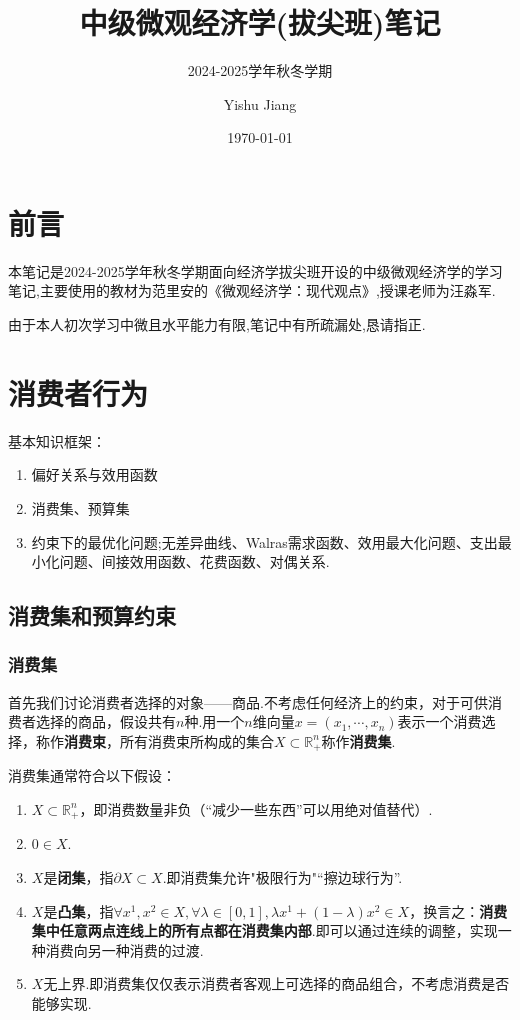 \documentclass[lang=cn,10pt]{elegantbook}
\title{中级微观经济学(拔尖班)笔记}
\subtitle{2024-2025学年秋冬学期}
\author{Yishu Jiang}
\institute{School of Economics,Zhejiang University}
\date{\today}
\begin{document}
\maketitle
\frontmatter
\chapter*{前言}
{\fangsong 
    本笔记是2024-2025学年秋冬学期面向经济学拔尖班开设的中级微观经济学的学习笔记,主要使用的教材为范里安的《微观经济学：现代观点》,授课老师为汪淼军.

    由于本人初次学习中微且水平能力有限,笔记中有所疏漏处,恳请指正.
}
\newpage

\tableofcontents

\mainmatter
\chapter{消费者行为}
基本知识框架：
\begin{enumerate}
    \item 偏好关系与效用函数
    \item 消费集、预算集
    \item 约束下的最优化问题;无差异曲线、Walras需求函数、效用最大化问题、支出最小化问题、间接效用函数、花费函数、对偶关系.
\end{enumerate}
\newpage
\section{消费集和预算约束}
\subsection{消费集}
首先我们讨论消费者选择的对象——商品.不考虑任何经济上的约束，对于可供消费者选择的商品，假设共有$n$种.用一个$n$维向量$x=(x_1,\cdots,x_n)$表示一个消费选择，称作\textbf{消费束}，所有消费束所构成的集合$X\subset \mathbb{R}^n_{+}$称作\textbf{消费集}.

消费集通常符合以下假设：
\begin{enumerate}
    \item $X\subset \mathbb{R}_{+}^{n}$，即消费数量非负（“减少一些东西”可以用绝对值替代）.
    \item $0\in X$.
    \item $X$是\textbf{闭集}，指$\partial X\subset X$.即消费集允许"极限行为"“擦边球行为”.
    \item $X$是\textbf{凸集}，指$\forall x^1,x^2\in X,\forall \lambda\in [0,1],\lambda x^1+(1-\lambda)x^2\in X$，换言之：\textbf{消费集中任意两点连线上的所有点都在消费集内部}.即可以通过连续的调整，实现一种消费向另一种消费的过渡.
    \item $X$无上界.即消费集仅仅表示消费者客观上可选择的商品组合，不考虑消费是否能够实现.
\end{enumerate}
\end{document}
